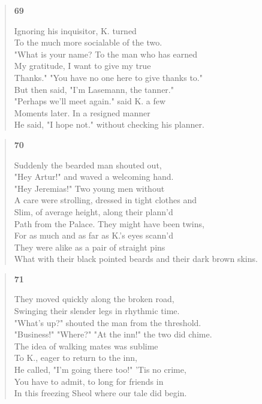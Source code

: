 \documentclass{article}
\begin{document}
\begin{verse}
  \begin{center}
    \textbf{69} \\
  \end{center}
  Ignoring his inquisitor, K. turned \\
  To the much more socialable of the two. \\
  "What is your name? To the man who has earned \\
  My gratitude, I want to give my true \\
  Thanks." "You have no one here to give thanks to." \\
  But then said, "I'm Lasemann, the tanner." \\
  "Perhaps we'll meet again." said K. a few \\
  Moments later. In a resigned manner \\
  He said, "I hope not." without checking his planner.
\end{verse}
\begin{verse}
  \begin{center}
    \textbf{70} \\
  \end{center}
  Suddenly the bearded man shouted out, \\
  "Hey Artur!" and waved a welcoming hand. \\
  "Hey Jeremias!" Two young men without \\
  A care were strolling, dressed in tight clothes and \\
  Slim, of average height, along their plann'd \\
  Path from the Palace. They might have been twins, \\
  For as much and as far as K.'s eyes scann'd \\
  They were alike as a pair of straight pins \\
  What with their black pointed beards and their dark brown skins.
\end{verse}
\begin{verse}
  \begin{center}
    \textbf{71}
  \end{center}
  They moved quickly along the broken road, \\
  Swinging their slender legs in rhythmic time. \\
  "What's up?" shouted the man from the threshold. \\
  "Business!" "Where?" "At the inn!" the two did chime. \\
  The idea of walking mates was sublime \\
  To K., eager to return to the inn, \\
  He called, "I'm going there too!" 'Tis no crime, \\
  You have to admit, to long for friends in \\ 
  In this freezing Sheol where our tale did begin.
\end{verse}
\end{document}
